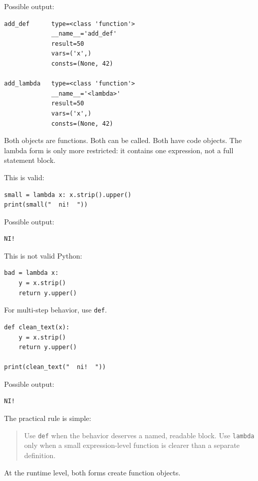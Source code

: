 Possible output:

\begin{verbatim}
add_def      type=<class 'function'>
             __name__='add_def'
             result=50
             vars=('x',)
             consts=(None, 42)

add_lambda   type=<class 'function'>
             __name__='<lambda>'
             result=50
             vars=('x',)
             consts=(None, 42)
\end{verbatim}

Both objects are functions. Both can be called. Both have code objects. The lambda form is only more restricted: it contains one expression, not a full statement block.

This is valid:

\begin{verbatim}
small = lambda x: x.strip().upper()
print(small("  ni!  "))
\end{verbatim}

Possible output:

\begin{verbatim}
NI!
\end{verbatim}

This is not valid Python:

\begin{verbatim}
bad = lambda x:
    y = x.strip()
    return y.upper()
\end{verbatim}

For multi-step behavior, use \texttt{def}.

\begin{verbatim}
def clean_text(x):
    y = x.strip()
    return y.upper()

print(clean_text("  ni!  "))
\end{verbatim}

Possible output:

\begin{verbatim}
NI!
\end{verbatim}

The practical rule is simple:

\begin{quote}
Use \texttt{def} when the behavior deserves a named, readable block. Use \texttt{lambda} only when a small expression-level function is clearer than a separate definition.
\end{quote}

At the runtime level, both forms create function objects.
